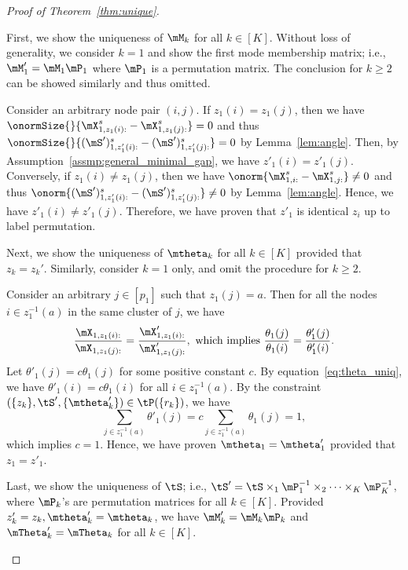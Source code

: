 \documentclass[lettersize,onecolumn,journal]{IEEEtran}
\theoremstyle{definition}
\theoremstyle{definition}
\begin{document}
\begin{proof}[Proof of Theorem~\ref{thm:unique}]
\begin{enumerate}[wide]
First, we show the uniqueness of $\mM_k$ for all $k \in [K]$. Without loss of generality, we consider $k=1$ and show the first mode membership matrix; i.e., $\mM'_1 = \mM_1\mP_1$ where $\mP_1$ is a permutation matrix. The conclusion for $k\geq 2$ can be showed similarly and thus omitted. 

Consider an arbitrary node pair $(i,j)$. If $z_1(i) = z_1(j)$, then we have $\onormSize{}{\mX_{1, z_1(i):}^s - \mX_{1, z_1(j):}^s } = 0$ and thus $\onormSize{}{ (\mS')_{1, z'_1(i):}^{s} - (\mS')_{1, z'_1(j):}^{s} } = 0$ by Lemma~\ref{lem:angle}. Then, by Assumption~\eqref{assmp:general_minimal_gap}, we have $z'_1(i) = z'_1(j)$. Conversely, if $z_1(i) \neq z_1(j)$, then we have $ \onorm{\mX_{1,i:}^s - \mX_{1,j:}^s} \neq 0$ and thus $\onorm{ (\mS')_{1, z'_1(i):}^{s} - (\mS')_{1, z'_1(j):}^{s} } \neq 0$ by Lemma~\ref{lem:angle}. Hence, we have $z'_1(i) \neq z'_1(j)$. Therefore, we have proven that $z'_1$ is identical $z_i$ up to label permutation.

Next, we show the uniqueness of $\mtheta_k$ for all $k \in [K]$ provided that $z_k = z_k'$. Similarly, consider $k=1$ only, and omit the procedure for $k\geq 2$. 

Consider an arbitrary $j \in [p_1]$ such that $z_1(j) = a$. Then for all the nodes $i \in  z_1^{-1}(a)$ in the same cluster of $j$, we have 
\begin{equation}
    \frac{\mX_{1,z_1(i):}}{\mX_{1,z_1(j):}} = \frac{\mX'_{1,z_1(i):}}{\mX'_{1,z_1(j):}}, \text{ which implies }  \frac{\theta_1(j)}{\theta_1(i)} = \frac{\theta'_1(j)}{\theta'_1(i)}.\label{eq:theta_uniq}
\end{equation}
Let $\theta'_1(j) = c\theta_1(j)$ for some positive constant $c$. By equation~\eqref{eq:theta_uniq}, we have $\theta'_1(i) = c \theta_1(i)$ for all $ i \in  z_1^{-1}(a)$. By the constraint $(\{z_k\}, \tS', \{\mtheta'_k\}) \in \tP(\{r_k\})$, we have 
\begin{equation}
    \sum_{j \in z_1^{-1}(a)} \theta'_1(j) = c \sum_{j \in z_1^{-1}(a)} \theta_1(j) = 1,
\end{equation}
which implies $c = 1$. Hence, we have proven $\mtheta_1 = \mtheta'_1$ provided that $z_1 = z'_1$.

Last, we show the uniqueness of $\tS$; i.e., $\tS'=\tS\times_1 \mP^{-1}_1\times_2\cdots \times_K \mP^{-1}_K$, where $\mP_k$'s are permutation matrices for all $k\in[K]$.  Provided $z'_k = z_k, \mtheta'_k = \mtheta_k$, we have $\mM'_k = \mM_k \mP_k$ and $\mTheta'_k = \mTheta_k$ for all $k \in [K]$. 


\end{enumerate}
\end{proof}
\end{document}
